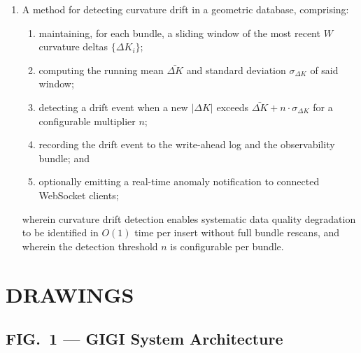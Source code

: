 \documentclass[11pt,letterpaper]{article}
\begin{document}
\begin{enumerate}
\item A method for detecting curvature drift in a geometric database, comprising:
\begin{enumerate}[label=(\alph*)]
  \item maintaining, for each bundle, a sliding window of the most recent $W$ curvature deltas $\{\Delta K_i\}$;
  \item computing the running mean $\bar{\Delta K}$ and standard deviation $\sigma_{\Delta K}$ of said window;
  \item detecting a drift event when a new $|\Delta K|$ exceeds $\bar{\Delta K} + n \cdot \sigma_{\Delta K}$ for a configurable multiplier $n$;
  \item recording the drift event to the write-ahead log and the observability bundle; and
  \item optionally emitting a real-time anomaly notification to connected WebSocket clients;
\end{enumerate}
wherein curvature drift detection enables systematic data quality degradation to be identified in $O(1)$ time per insert without full bundle rescans, and wherein the detection threshold $n$ is configurable per bundle.

\end{enumerate}


\newpage
\section*{DRAWINGS}

\subsection*{FIG.\ 1 --- GIGI System Architecture}
\end{document}
